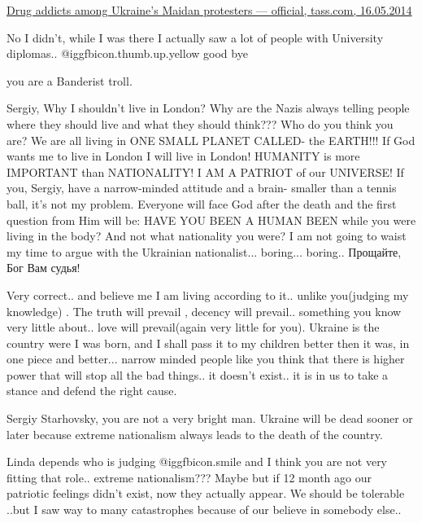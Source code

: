 \begin{itemize}
\begin{itemize}
\href{https://tass.com/world/731910}{%
Drug addicts among Ukraine's Maidan protesters — official, tass.com, 16.05.2014%
}


No I didn't, while I was there I actually saw a lot of people with University
diplomas.. @igg{fbicon.thumb.up.yellow} good bye


you are a Banderist troll.


Sergiy, Why I shouldn't live in London? Why are the Nazis always telling people
where they should live and what they should think??? Who do you think you are?
We are all living in ONE SMALL PLANET CALLED- the EARTH!!! If God wants me to
live in London I will live in London! HUMANITY is more IMPORTANT than
NATIONALITY! I AM A PATRIOT of our UNIVERSE! If you, Sergiy, have a
narrow-minded attitude and a brain- smaller than a tennis ball, it's not my
problem. Everyone will face God after the death and the first question from Him
will be: HAVE YOU BEEN A HUMAN BEEN while you were living in the body? And not
what nationality you were? I am not going to waist my time to argue with the
Ukrainian nationalist... boring... boring.. Прощайте, Бог Вам судья!


Very correct.. and believe me I am living according to it.. unlike you(judging my
knowledge) . The truth will prevail , decency will prevail.. something you know
very little about.. love will prevail(again very little for you). Ukraine is the
country were I was born, and I shall pass it to my children better then it
was, in one piece and better... narrow minded people like you think that there is
higher power that will stop all the bad things.. it doesn't exist.. it is in us
to take a stance and defend the right cause.


Sergiy Starhovsky, you are not a very bright man. Ukraine will be dead sooner
or later because extreme nationalism always leads to the death of the country.


Linda depends who is judging  @igg{fbicon.smile}  and I think you are not very fitting that
role.. extreme nationalism??? Maybe but if 12 month ago our patriotic feelings
didn't exist, now they actually appear. We should be tolerable ..but I saw way
to many catastrophes because of our believe in somebody else..


\end{itemize}
\end{itemize}
